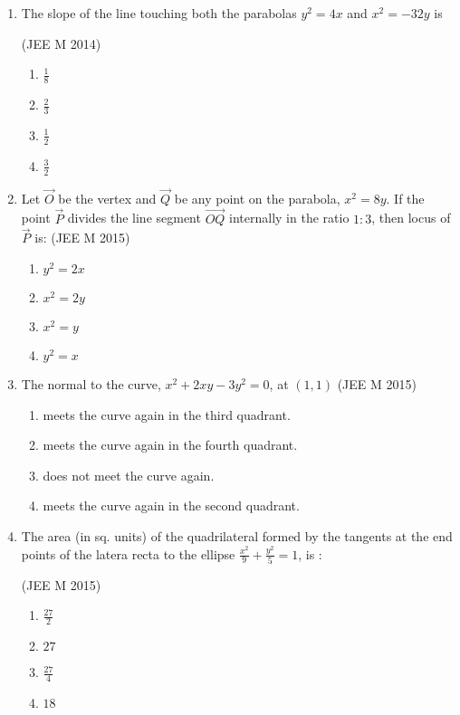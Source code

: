\documentclass[journal,12pt,twocolumn]{IEEEtran}
\theoremstyle{remark}
\begin{document}
\begin{enumerate}
    \item The slope of the line touching both the parabolas $y^2=4x$ and $x^2=-32y$ is

    \hfill(JEE M 2014)
    \begin{enumerate}[label=(\alph*)]
    \item$\frac{1}{8}$
    \item$\frac{2}{3}$
    \item$\frac{1}{2}$
    \item$\frac{3}{2}$ \\
    \end{enumerate}

    \item Let $\vec{O}$ be the vertex and $\vec{Q}$ be any point on the parabola, $x^2=8y$. If the point $\vec{P}$ divides the line segment $\vec{OQ}$ internally in the ratio $1:3$, then locus of $\vec{P}$ is:
    \hfill(JEE M 2015)
    \begin{enumerate}[label=(\alph*)]
    \item$y^2=2x$
    \item$x^2=2y$
    \item$x^2=y$
    \item$y^2=x$ \\
    \end{enumerate}

    \item The normal to the curve, $x^2+2xy-3y^2=0$, at $(1,1)$
    \hfill(JEE M 2015)
    \begin{enumerate}[label=(\alph*)]
    \item meets the curve again in the third quadrant.
    \item meets the curve again in the fourth quadrant.
    \item does not meet the curve again.
    \item meets the curve again in the second quadrant.\\
    \end{enumerate}
    \item The area (in sq. units) of the quadrilateral formed by the tangents at the end points of the latera recta to the ellipse $\frac{x^2}{9}+\frac{y^2}{5}=1$, is :
    
    \hfill(JEE M 2015)
    \begin{enumerate}[label=(\alph*)]
    \item$\frac{27}{2}$
    \item$27$
    \item$\frac{27}{4}$
    \item$18$ \\
    \end{enumerate}


\end{enumerate}
\end{document}
